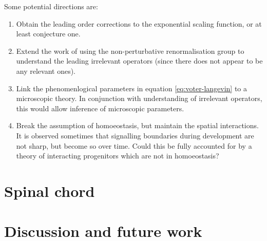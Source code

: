 \documentclass[10pt,english]{report}
\begin{document}
Some potential directions are:

\begin{enumerate}

\item Obtain the leading order corrections to the exponential scaling function, or at least conjecture one.

\item Extend the work of \citet{canet05} using the non-perturbative renormalisation group to understand the leading irrelevant operators (since there does not appear to be any relevant ones).

\item Link the phenomenlogical parameters in equation \eqref{eq:voter-langevin} to a microscopic theory. In conjunction with understanding of irrelevant operators, this would allow inference of microscopic parameters.

\item Break the assumption of homoeostasis, but maintain the spatial interactions. It is observed sometimes that signalling boundaries during development are not sharp, but become so over time. Could this be fully accounted for by a theory of interacting progenitors which are not in homoeostasis?

\end{enumerate}

\chapter{Spinal chord}


\chapter{Discussion and future work}


\newpage
{}
\renewcommand\bibname{References}
%
\printbibliography[]
\end{document}
